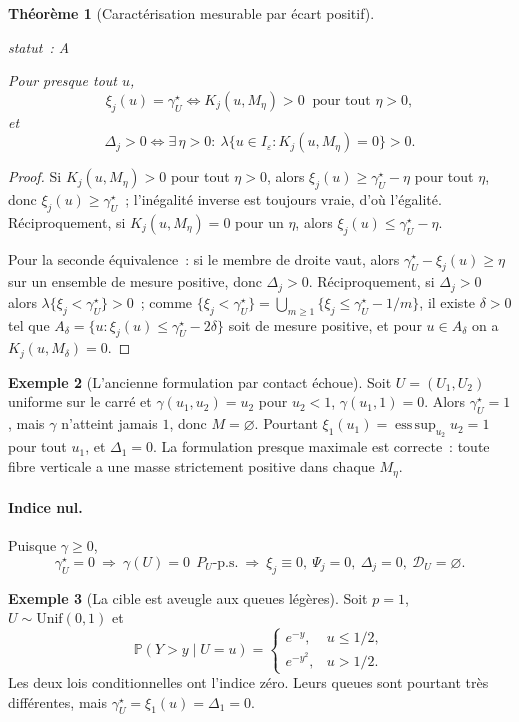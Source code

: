 \documentclass[11pt]{article}
\theoremstyle{plain}
\newtheorem{theoreme}{Théorème}[section]
\theoremstyle{definition}
\newtheorem{exemple}[theoreme]{Exemple}
\theoremstyle{remark}
\DeclareMathOperator*{\esssup}{ess\,sup}
\newcommand{\Pp}{\mathbb P}
\newcommand{\1}{\mathbf 1}
\newcommand{\I}{I_\varepsilon}
\newcommand{\D}{\mathcal D_U}
\newcommand{\gU}{\gamma^\star_U}
\newcommand{\statut}[1]{%
  \nopagebreak\par\nopagebreak
  \hfill{\normalfont\footnotesize\textcolor{gris}{statut~: #1}}%
  \par\nopagebreak\vspace{-2pt}}
\begin{document}
\begin{theoreme}[Caractérisation mesurable par écart positif]
\label{thm:gap-mesurable}
\statut{A}
Pour presque tout $u$,
\[
 \xi_j(u)=\gU
 \iff
 K_j(u,M_\eta)>0\ \text{ pour tout }\eta>0,
\]
et
\[
 \Delta_j>0
 \iff
 \exists\,\eta>0:\ \lambda\{u\in\I:K_j(u,M_\eta)=0\}>0 .
\]
\end{theoreme}

\begin{proof}
Si $K_j(u,M_\eta)>0$ pour tout $\eta>0$, alors
$\xi_j(u)\ge\gU-\eta$ pour tout $\eta$, donc $\xi_j(u)\ge\gU$~;
l'inégalité inverse est toujours vraie, d'où l'égalité. Réciproquement,
si $K_j(u,M_\eta)=0$ pour un $\eta$, alors $\xi_j(u)\le\gU-\eta$.

Pour la seconde équivalence~: si le membre de droite vaut, alors
$\gU-\xi_j(u)\ge\eta$ sur un ensemble de mesure positive, donc
$\Delta_j>0$. Réciproquement, si $\Delta_j>0$ alors
$\lambda\{\xi_j<\gU\}>0$~; comme
$\{\xi_j<\gU\}=\bigcup_{m\ge1}\{\xi_j\le\gU-1/m\}$, il existe $\delta>0$
tel que $A_\delta=\{u:\xi_j(u)\le\gU-2\delta\}$ soit de mesure positive,
et pour $u\in A_\delta$ on a $K_j(u,M_\delta)=0$.
\end{proof}

\begin{exemple}[L'ancienne formulation par contact échoue]
Soit $U=(U_1,U_2)$ uniforme sur le carré et
$\gamma(u_1,u_2)=u_2$ pour $u_2<1$, $\gamma(u_1,1)=0$. Alors $\gU=1$,
mais $\gamma$ n'atteint jamais $1$, donc $M=\varnothing$. Pourtant
$\xi_1(u_1)=\esssup_{u_2}u_2=1$ pour tout $u_1$, et $\Delta_1=0$. La
formulation presque maximale est correcte~: toute fibre verticale a une
masse strictement positive dans chaque $M_\eta$.
\end{exemple}

\paragraph{Indice nul.} Puisque $\gamma\ge0$,
\[
 \gU=0\ \Longrightarrow\ \gamma(U)=0\ \ P_U\text{-p.s.}
 \ \Longrightarrow\ \xi_j\equiv0,\ \Psi_j=0,\ \Delta_j=0,\ \D=\varnothing .
\]

\begin{exemple}[La cible est aveugle aux queues légères]
\label{ex:aveugle}
Soit $p=1$, $U\sim\mathrm{Unif}(0,1)$ et
\[
 \Pp(Y>y\mid U=u)=
 \begin{cases}
  e^{-y}, & u\le1/2,\\
  e^{-y^2}, & u>1/2 .
 \end{cases}
\]
Les deux lois conditionnelles ont l'indice zéro. Leurs queues sont
pourtant très différentes, mais
$\gU=\xi_1(u)=\Delta_1=0$.
\end{exemple}
\end{document}
